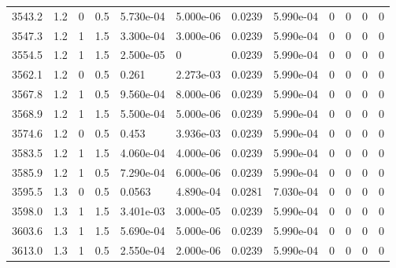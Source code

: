 \documentclass[preview]{standalone}
\begin{document}
{{{{{{{{{{{{{{\begin{tabular}{L{1.2cm}C{1.2cm} C{0.3cm}C{0.5cm} C{1.4cm}C{1.4cm} C{1.4cm}C{1.4cm} C{1.6cm}C{1.6cm} C{1.6cm}C{1.6cm}}
  3543.2  &   1.2  & 0     & 0.5 &  5.730e-04  & 5.000e-06  &  0.0239&   5.990e-04& 0 & 0   &  0 & 0  \\ 
  3547.3  &   1.2  & 1     & 1.5 &  3.300e-04  & 3.000e-06  &  0.0239&   5.990e-04& 0 & 0   &  0 & 0  \\ 
  3554.5  &   1.2  & 1     & 1.5 &  2.500e-05  & 0  &  0.0239&   5.990e-04& 0 & 0   &  0 & 0  \\ 
  3562.1  &   1.2  & 0     & 0.5 &  0.261  & 2.273e-03  &  0.0239&   5.990e-04& 0 & 0   &  0 & 0  \\ 
  3567.8  &   1.2  & 1     & 0.5 &  9.560e-04  & 8.000e-06  &  0.0239&   5.990e-04& 0 & 0   &  0 & 0  \\ 
  3568.9  &   1.2  & 1     & 1.5 &  5.500e-04  & 5.000e-06  &  0.0239&   5.990e-04& 0 & 0   &  0 & 0  \\ 
  3574.6  &   1.2  & 0     & 0.5 &  0.453  & 3.936e-03  &  0.0239&   5.990e-04& 0 & 0   &  0 & 0  \\ 
  3583.5  &   1.2  & 1     & 1.5 &  4.060e-04  & 4.000e-06  &  0.0239&   5.990e-04& 0 & 0   &  0 & 0  \\ 
  3585.9  &   1.2  & 1     & 0.5 &  7.290e-04  & 6.000e-06  &  0.0239&   5.990e-04& 0 & 0   &  0 & 0  \\ 
  3595.5  &   1.3  & 0     & 0.5 &  0.0563  & 4.890e-04  &  0.0281&   7.030e-04& 0 & 0   &  0 & 0  \\ 
  3598.0  &   1.3  & 1     & 1.5 &  3.401e-03  & 3.000e-05  &  0.0239&   5.990e-04& 0 & 0   &  0 & 0  \\ 
  3603.6  &   1.3  & 1     & 1.5 &  5.690e-04  & 5.000e-06  &  0.0239&   5.990e-04& 0 & 0   &  0 & 0  \\ 
  3613.0  &   1.3  & 1     & 0.5 &  2.550e-04  & 2.000e-06  &  0.0239&   5.990e-04& 0 & 0   &  0 & 0  \\ 
\hline 
\end{tabular} 

}}}}}}}}}}}}}}
\end{document}
